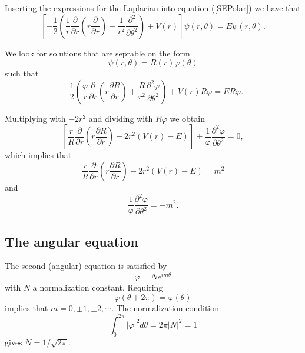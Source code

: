 \documentclass[aip,jcp,reprint,floatfix]{revtex4-1}
\begin{document}
\begin{appendices}
Inserting the expressions for the Laplacian into equation (\ref{SEPolar}) we have that
\begin{equation}
    \left[ - \frac{1}{2} \left(\frac{1}{r} \frac{\partial}{\partial r} \left( r \frac{\partial}{\partial r} \right) + \frac{1}{r^2} \frac{\partial^2}{\partial \theta^2} \right) + V(r) \right] \psi(r,\theta) = E\psi(r,\theta).
\end{equation}

We look for solutions that are seprable on the form
\begin{equation}
    \psi(r,\theta) = R(r) \varphi(\theta)
\end{equation}
such that
\begin{equation*}
     - \frac{1}{2} \left(\frac{\varphi}{r} \frac{\partial}{\partial r} \left( r \frac{\partial R}{\partial r} \right) + \frac{R}{r^2} \frac{\partial^2 \varphi}{\partial \theta^2} \right) + V(r)R\varphi   = ER\varphi.
\end{equation*}

Multiplying with $-2r^2$ and dividing with $R\varphi$ we obtain
\begin{equation*}
      \left[\frac{r}{R}\frac{\partial}{\partial r} \left( r \frac{\partial R}{\partial r} \right) -2r^2 (V(r)-E) \right] + \frac{1}{\varphi} \frac{\partial^2 \varphi}{\partial \theta^2}     = 0,
\end{equation*}
which implies that 
\begin{equation}
    \frac{r}{R}\frac{\partial}{\partial r} \left( r \frac{\partial R}{\partial r} \right) -2r^2 (V(r)-E) = m^2 \end{equation}
    and
    \begin{equation}
    \frac{1}{\varphi} \frac{\partial^2 \varphi}{\partial \theta^2} = -m^2.
\end{equation}

\subsection{The angular equation}
The second (angular) equation is satisfied by 
\begin{equation}
    \varphi = Ne^{im\theta}
\end{equation}
with $N$ a normalization constant. Requiring 
\begin{equation}
    \varphi(\theta + 2\pi) = \varphi(\theta)
\end{equation}
implies that $m=0,\pm 1, \pm 2,\cdots$. The normalization condition 
\begin{equation}
\int_0^{2\pi} |\varphi|^2 d\theta = 2\pi|N|^2 = 1    
\end{equation} gives $N = 1/\sqrt{2\pi}$.


\end{appendices}
\end{document}
